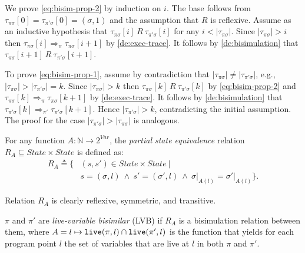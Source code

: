 \begin{myproof}
We prove \eqref{eq:bisim-prop-2} by induction on $i$. The base follows from $\tau_{\pi\sigma}[0]=\tau_{\pi'\sigma}[0]=(\sigma,1)$ and the assumption that $R$ is reflexive. Assume as an inductive hypothesis that $\tau_{\pi\sigma}[i]~R~\tau_{\pi'\sigma}[i]$ for any $i<|\tau_{\pi\sigma}|$. Since $|\tau_{\pi\sigma}|>i$ then $\tau_{\pi\sigma}[i] \Rightarrow_{\pi} \tau_{\pi\sigma}[i+1]$ by \ref{de:exec-trace}. It follows by \ref{de:bisimulation} that $\tau_{\pi\sigma}[i+1]~R~\tau_{\pi'\sigma}[i+1]$.

To prove \eqref{eq:bisim-prop-1}, assume by contradiction that $|\tau_{\pi\sigma}|\neq|\tau_{\pi'\sigma}|$, e.g., $|\tau_{\pi\sigma}|>|\tau_{\pi'\sigma}|=k$. Since $|\tau_{\pi\sigma}|>k$ then $\tau_{\pi\sigma}[k]~R~\tau_{\pi'\sigma}[k]$ by \eqref{eq:bisim-prop-2} and $\tau_{\pi\sigma}[k] \Rightarrow_{\pi} \tau_{\pi\sigma}[k+1]$ by \ref{de:exec-trace}. It follows by \ref{de:bisimulation} that $\tau_{\pi'\sigma}[k] \Rightarrow_{\pi'} \tau_{\pi'\sigma}[k+1]$. Hence $|\tau_{\pi'\sigma}|>k$, contradicting the initial assumption. The proof for the case $|\tau_{\pi'\sigma}|>|\tau_{\pi\sigma}|$ is analogous.
\end{myproof}

\begin{definition}
\label{de:state-equiv-relation}
For any function $A:\mathbb{N}\rightarrow 2^{Var}$, the {\em partial state equivalence} relation $R_A\subseteq State\times State$ is defined as:
\begin{equation*}
\begin{split}
R_A\triangleq\{ & (s, s')\in State\times State ~ | ~  \\
& s=(\sigma,l) ~ \wedge ~ s'=(\sigma',l) ~ \wedge ~ \sigma\vert_{A(l)} = \sigma'\vert_{A(l)} \}.
\end{split}
\end{equation*}
\end{definition}

\noindent Relation $R_A$ is clearly reflexive, symmetric, and transitive.

\begin{definition}
\label{de:lvb-programs}
$\pi$ and $\pi'$ are {\em live-variable bisimilar} (LVB) if $R_{A}$ is a bisimulation relation between them, where $A=l\mapsto\text{${\tt live}$}(\pi,l)\cap \text{${\tt live}$}(\pi',l)$ is the function that yields for each program point $l$ the set of variables that are live at $l$ in both $\pi$ and $\pi'$.
\end{definition}


